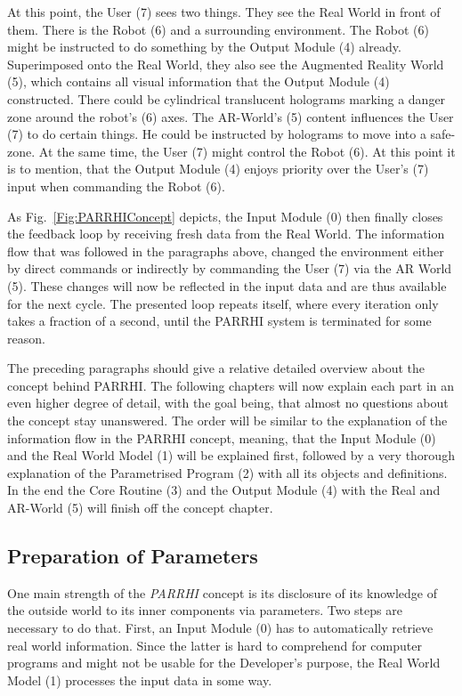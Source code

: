 At this point, the User (7) sees two things. They see the Real World in front of them. There is the Robot (6) and a surrounding environment. The Robot (6) might be instructed to do something by the Output Module (4) already. Superimposed onto the Real World, they also see the Augmented Reality World (5), which contains all visual information that the Output Module (4) constructed. There could be cylindrical translucent holograms marking a danger zone around the robot's (6) axes. The AR-World's (5) content influences the User (7) to do certain things. He could be instructed by holograms to move into a safe-zone. At the same time, the User (7) might control the Robot (6). At this point it is to mention, that the Output Module (4) enjoys priority over the User's (7) input when commanding the Robot (6).

As Fig.~\ref{Fig:PARRHIConcept} depicts, the Input Module (0) then finally closes the feedback loop by receiving fresh data from the Real World. The information flow that was followed in the paragraphs above, changed the environment either by direct commands or indirectly by commanding the User (7) via the AR World (5). These changes will now be reflected in the input data and are thus available for the next cycle. The presented loop repeats itself, where every iteration only takes a fraction of a second, until the PARRHI system is terminated for some reason. 

The preceding paragraphs should give a relative detailed overview about the concept behind PARRHI. The following chapters will now explain each part in an even higher degree of detail, with the goal being, that almost no questions about the concept stay unanswered. The order will be similar to the explanation of the information flow in the PARRHI concept, meaning, that the Input Module (0) and the Real World Model (1) will be explained first, followed by a very thorough explanation of the Parametrised Program (2) with all its objects and definitions. In the end the Core Routine (3) and the Output Module (4) with the Real and AR-World (5) will finish off the concept chapter.


\subsection{Preparation of Parameters}
One main strength of the \textit{PARRHI} concept is its disclosure of its knowledge of the outside world to its inner components via parameters. Two steps are necessary to do that. First, an Input Module (0) has to automatically retrieve real world information. Since the latter is hard to comprehend for computer programs and might not be usable for the Developer's purpose, the Real World Model (1) processes the input data in some way. 

